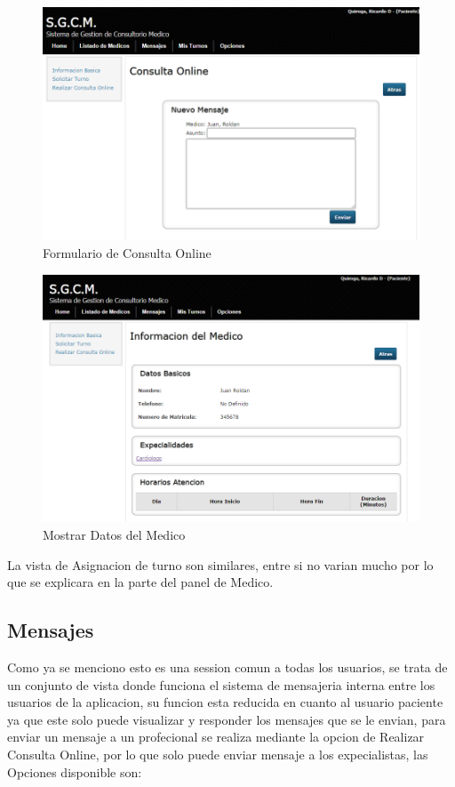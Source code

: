 \begin{figure}[H]
    \centering
    \includegraphics[scale=0.5]{resourse/consulta-online.png}
    \caption{Formulario de Consulta Online}
    \label{fig:68}
\end{figure}

\begin{figure}[H]
    \centering
    \includegraphics[scale=0.5]{resourse/medico-mostrar.png}
    \caption{Mostrar Datos del Medico}
    \label{fig:69}
\end{figure}

La vista de Asignacion de turno son similares, entre si no varian mucho por lo que
se explicara en la parte del panel de Medico.


\subsection{Mensajes}

Como ya se menciono esto es una session comun a todas los usuarios, se trata de un
conjunto de vista donde funciona el sistema de mensajeria interna entre los usuarios
de la aplicacion, su funcion esta reducida en cuanto al usuario paciente ya que
este solo puede visualizar y responder los mensajes que se le envian, para enviar
un mensaje a un profecional se realiza mediante la opcion de Realizar Consulta
Online, por lo que solo puede enviar mensaje a los expecialistas, las Opciones
disponible son:

